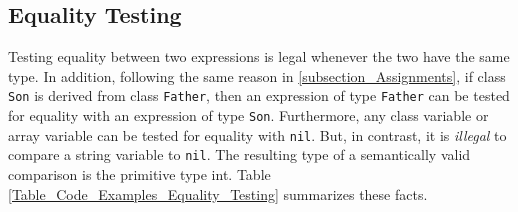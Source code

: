 \documentclass{article}
\begin{document}
\subsection{Equality Testing}
\label{subsection_Equality_Testing}
Testing equality between two expressions is legal whenever the two have the same type.
In addition, following the same reason in \ref{subsection_Assignments},
if class \verb"Son" is derived from class \verb"Father",
then an expression  of type \verb"Father" can be
tested for equality with an expression of type \verb"Son".
Furthermore, any class variable or array variable can be tested for equality with \verb"nil".
But, in contrast, it is \textit{illegal} to compare a string variable to \verb"nil".
The resulting type of a semantically valid comparison is the primitive type int.
Table \ref{Table_Code_Examples_Equality_Testing} summarizes these facts.
\end{document}
